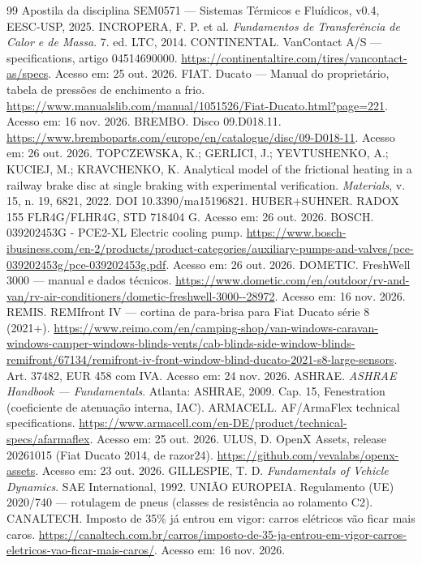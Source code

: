 \documentclass[12pt,a4paper]{article}
\begin{document}
\begin{thebibliography}{99}
 Apostila da disciplina SEM0571 — Sistemas Térmicos e Fluídicos, v0.4, EESC-USP, 2025.
 INCROPERA, F. P. et al. \emph{Fundamentos de Transferência de Calor e de Massa}. 7. ed. LTC, 2014.
 CONTINENTAL. VanContact A/S — specifications, artigo 04514690000. \url{https://continentaltire.com/tires/vancontact-as/specs}. Acesso em: 25 out. 2026.
 FIAT. Ducato — Manual do proprietário, tabela de pressões de enchimento a frio. \url{https://www.manualslib.com/manual/1051526/Fiat-Ducato.html?page=221}. Acesso em: 16 nov. 2026.
 BREMBO. Disco 09.D018.11. \url{https://www.bremboparts.com/europe/en/catalogue/disc/09-D018-11}. Acesso em: 26 out. 2026.
 TOPCZEWSKA, K.; GERLICI, J.; YEVTUSHENKO, A.; KUCIEJ, M.; KRAVCHENKO, K. Analytical model of the frictional heating in a railway brake disc at single braking with experimental verification. \emph{Materials}, v. 15, n. 19, 6821, 2022. DOI 10.3390/ma15196821.
 HUBER+SUHNER. RADOX 155 FLR4G/FLHR4G, STD 718404 G. Acesso em: 26 out. 2026.
 BOSCH. 039202453G - PCE2-XL Electric cooling pump. \url{https://www.bosch-ibusiness.com/en-2/products/product-categories/auxiliary-pumps-and-valves/pce-039202453g/pce-039202453g.pdf}. Acesso em: 26 out. 2026.
 DOMETIC. FreshWell 3000 — manual e dados técnicos. \url{https://www.dometic.com/en/outdoor/rv-and-van/rv-air-conditioners/dometic-freshwell-3000--28972}. Acesso em: 16 nov. 2026.
 REMIS. REMIfront IV — cortina de para-brisa para Fiat Ducato série 8 (2021+). \url{https://www.reimo.com/en/camping-shop/van-windows-caravan-windows-camper-windows-blinds-vents/cab-blinds-side-window-blinds-remifront/67134/remifront-iv-front-window-blind-ducato-2021-s8-large-sensors}. Art. 37482, EUR 458 com IVA. Acesso em: 24 nov. 2026.
 ASHRAE. \emph{ASHRAE Handbook — Fundamentals}. Atlanta: ASHRAE, 2009. Cap. 15, Fenestration (coeficiente de atenuação interna, IAC).
 ARMACELL. AF/ArmaFlex technical specifications. \url{https://www.armacell.com/en-DE/product/technical-specs/afarmaflex}. Acesso em: 25 out. 2026.
 ULUS, D. OpenX Assets, release 20261015 (Fiat Ducato 2014, de razor24). \url{https://github.com/vevalabs/openx-assets}. Acesso em: 23 out. 2026.
 GILLESPIE, T. D. \emph{Fundamentals of Vehicle Dynamics}. SAE International, 1992.
 UNIÃO EUROPEIA. Regulamento (UE) 2020/740 — rotulagem de pneus (classes de resistência ao rolamento C2).
 CANALTECH. Imposto de 35\% já entrou em vigor: carros elétricos vão ficar mais caros. \url{https://canaltech.com.br/carros/imposto-de-35-ja-entrou-em-vigor-carros-eletricos-vao-ficar-mais-caros/}. Acesso em: 16 nov. 2026.

\end{thebibliography}
\end{document}
